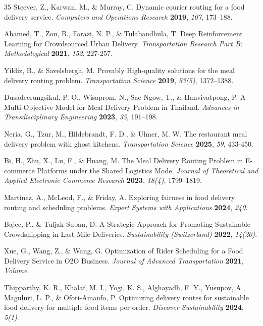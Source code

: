\documentclass[runningheads]{llncs}
\begin{document}
\begin{thebibliography}{35}
Steever, Z., Karwan, M., \& Murray, C. Dynamic courier routing for a food delivery service. {\em Computers and Operations Research} {\bf 2019}, {\em 107}, 173--188.

Ahamed, T., Zou, B., Farazi, N. P., \& Tulabandhula, T. Deep Reinforcement Learning for Crowdsourced Urban Delivery. {\em Transportation Research Part B: Methodological} {\bf 2021}, {\em 152}, 227-257.

Yildiz, B., \& Savelsbergh, M. Provably High-quality solutions for the meal delivery routing problem. {\em Transportation Science} {\bf 2019}, {\em 53(5)}, 1372--1388.

Dusadeerungsikul, P. O., Wisaprom, N., Sae-Ngow, T., \& Hanvivatpong, P. A Multi-Objective Model for Meal Delivery Problem in Thailand. {\em Advances in Transdisciplinary Engineering} {\bf 2023}, {\em 35}, 191--198.

Neria, G., Tzur, M., Hildebrandt, F. D., \& Ulmer, M. W. The restaurant meal delivery problem with ghost kitchens. {\em Transportation Science} {\bf 2025}, {\em 59}, 433-450.

Bi, H., Zhu, X., Lu, F., \& Huang, M. The Meal Delivery Routing Problem in E-commerce Platforms under the Shared Logistics Mode. {\em Journal of Theoretical and Applied Electronic Commerce Research} {\bf 2023}, {\em 18(4)}, 1799--1819.


Martínez, A., McLeod, F., \& Friday, A. Exploring fairness in food delivery routing and scheduling problems. {\em Expert Systems with Applications} {\bf 2024}, {\em 240}.

Bajec, P., \& Tuljak-Suban, D. A Strategic Approach for Promoting Sustainable Crowdshipping in Last-Mile Deliveries. {\em Sustainability (Switzerland)} {\bf 2022}, {\em 14(20)}.

Xue, G., Wang, Z., \& Wang, G. Optimization of Rider Scheduling for a Food Delivery Service in O2O Business. {\em Journal of Advanced Transportation} {\bf 2021}, {\em Volume}.

Thipparthy, K. R., Khalaf, M. I., Yogi, K. S., Alghayadh, F. Y., Yusupov, A., Maguluri, L. P., \& Ofori-Amanfo, P. Optimizing delivery routes for sustainable food delivery for multiple food items per order. {\em Discover Sustainability} {\bf 2024}, {\em 5(1)}.


\end{thebibliography}
\end{document}
